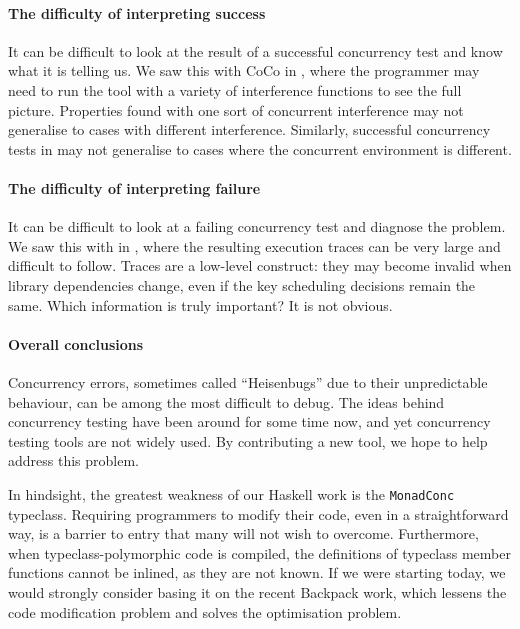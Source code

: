 \paragraph{The difficulty of interpreting success}
It can be difficult to look at the result of a successful concurrency
test and know what it is telling us.  We saw this with CoCo in
, where the programmer may need to run the tool
with a variety of interference functions to see the full picture.
Properties found with one sort of concurrent interference may not
generalise to cases with different interference.  Similarly,
successful concurrency tests in \dejafu{} may not generalise to cases
where the concurrent environment is different.

\paragraph{The difficulty of interpreting failure}
It can be difficult to look at a failing concurrency test and diagnose
the problem.  We saw this with \dejafu{} in
, where the resulting execution
traces can be very large and difficult to follow.  Traces are a
low-level construct: they may become invalid when library dependencies
change, even if the key scheduling decisions remain the same.  Which
information is truly important?  It is not obvious.

\paragraph{Overall conclusions}
Concurrency errors, sometimes called ``Heisenbugs'' due to their
unpredictable behaviour, can be among the most difficult to
debug\cite{musuvathi2008osdi}.  The ideas behind concurrency testing
have been around for some time now\cite{godefroid1996}, and yet
concurrency testing tools are not widely used.  By contributing a new
tool, we hope to help address this problem.

In hindsight, the greatest weakness of our Haskell work is the
\verb|MonadConc| typeclass.  Requiring programmers to modify their
code, even in a straightforward way, is a barrier to entry that many
will not wish to overcome.  Furthermore, when typeclass-polymorphic
code is compiled, the definitions of typeclass member functions cannot
be inlined, as they are not known\cite{peytonjones2002}.  If we were
starting \dejafu{} today, we would strongly consider basing it on the
recent Backpack work\cite{yang2017}, which lessens the code
modification problem and solves the optimisation problem.

%
